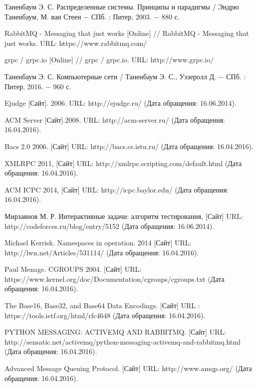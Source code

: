 \begin{thebibliography}{9}

Таненбаум Э. С. Распределенные системы. Принципы и парадигмы / Эндрю Таненбаум, М. ван Стеен − СПб. : Питер, 2003. − 880 с.

RabbitMQ - Messaging that just works [Online] // RabbitMQ - Messaging that just works. URL: https://www.rabbitmq.com/

grpc / grpc.io [Online] // grpc / grpc.io. URL: http://www.grpc.io/

Таненбаум Э. С. Компьютерные сети / Таненбаум Э. С., Уэзеролл Д. − СПб. : Питер, 2016. − 960 с.

Ejudge [Сайт]. 2006. URL: http://ejudge.ru/ (Дата обращения: 16.06.2014).

ACM Server [Сайт].2008. URL: http://acm-server.ru/ (Дата обращения: 16.04.2016).

Bacs 2.0 2006. [Сайт] URL: http://bacs.cs.istu.ru/ (Дата обращения: 16.04.2016).

XMLRPC 2011, [Сайт] URL: http://xmlrpc.scripting.com/default.html (Дата обращения: 16.04.2016).

ACM ICPC 2014, [Сайт] URL: http://icpc.baylor.edu/ (Дата обращения: 16.04.2016).

Мирзаянов М. Р. Интерактивные задачи: алгоритм тестирования, [Сайт] URL: http://codeforces.ru/blog/entry/5152 (Дата обращения: 16.06.2014).

Michael Kerrisk. Namespaces in operation. 2014 [Сайт] URL: http://lwn.net/Articles/531114/ (Дата обращения: 16.04.2016).

Paul Menage. CGROUPS 2004. [Сайт] URL: https://www.kernel.org/doc/Documentation/cgroups/cgroups.txt (Дата обращения: 16.04.2016).

The Base16, Base32, and Base64 Data Encodings. [Сайт] URL : https://tools.ietf.org/html/rfc4648 (Дата обращения: 16.04.2016).

PYTHON MESSAGING: ACTIVEMQ AND RABBITMQ. [Сайт] URL: http://sensatic.net/activemq/python-messaging-activemq-and-rabbitmq.html (Дата обращения: 16.04.2016).

Advanced Message Queuing Protocol. [Сайт] URL: http://www.amqp.org/ (Дата обращения: 16.04.2016).


\end{thebibliography}
